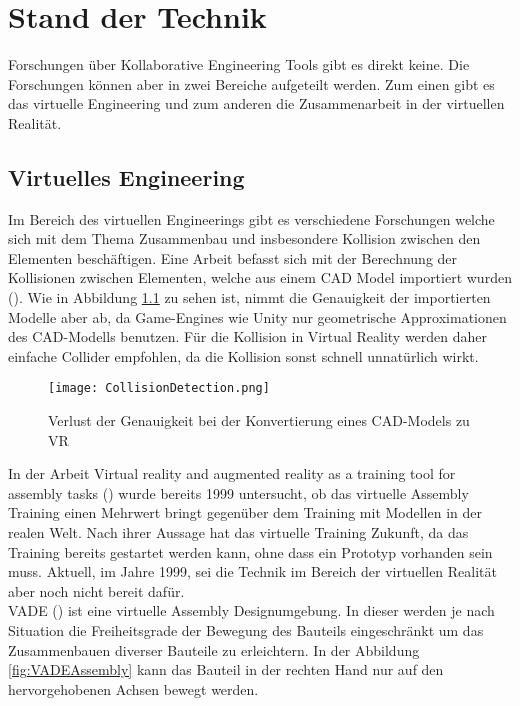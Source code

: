 \chapter{Stand der Technik}
\label{ch:StandDerTechnik}

Forschungen über Kollaborative Engineering Tools gibt es direkt keine. Die Forschungen können aber in zwei Bereiche aufgeteilt werden. Zum einen gibt es das virtuelle Engineering und zum anderen die Zusammenarbeit in der virtuellen Realität.

\section{Virtuelles Engineering}

Im Bereich des virtuellen Engineerings gibt es verschiedene Forschungen welche sich mit dem Thema Zusammenbau und insbesondere Kollision zwischen den Elementen beschäftigen.
Eine Arbeit befasst sich mit der Berechnung der Kollisionen zwischen Elementen, welche aus einem CAD Model importiert wurden (\cite{tching_interactive_2010}).
Wie in Abbildung \ref{fig:LossOfAccuracy} zu sehen ist, nimmt die Genauigkeit der importierten Modelle aber ab, da Game-Engines wie Unity nur geometrische Approximationen des CAD-Modells benutzen. Für die Kollision in Virtual Reality werden daher einfache \grqq Collider\grqq{} empfohlen, da die Kollision sonst schnell unnatürlich wirkt.

\begin{figure}[h!]
	\centering
	\texttt{[image: CollisionDetection.png]}
	\caption{Verlust der Genauigkeit bei der Konvertierung eines CAD-Models zu VR}
	\label{fig:LossOfAccuracy}
\end{figure}

In der Arbeit \grqq Virtual reality and augmented reality as a training tool for assembly tasks\grqq{} (\cite{boud_virtual_1999}) wurde bereits 1999 untersucht, ob das virtuelle Assembly Training einen Mehrwert bringt gegenüber dem Training mit Modellen in der realen Welt. Nach ihrer Aussage hat das virtuelle Training Zukunft, da das Training bereits gestartet werden kann, ohne dass ein Prototyp vorhanden sein muss. Aktuell, im Jahre 1999, sei die Technik im Bereich der virtuellen Realität aber noch nicht bereit dafür. \\

\noindent VADE (\cite{tirumali_vade:_1999}) ist eine virtuelle Assembly Designumgebung. In dieser werden je nach Situation die Freiheitsgrade der Bewegung des Bauteils eingeschränkt um das Zusammenbauen diverser Bauteile zu erleichtern. 
In der Abbildung \ref{fig:VADEAssembly} kann das Bauteil in der rechten Hand nur auf den hervorgehobenen Achsen bewegt werden.

